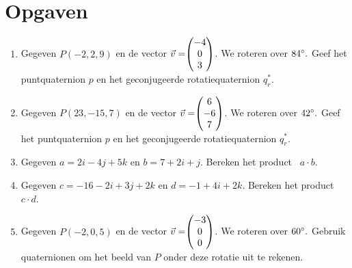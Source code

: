 
\newpage
\section{Opgaven}
\begin{enumerate}
	\item Gegeven $ P (-2, 2, 9) $ en de vector $\vec{v} = \vecdrie{-4}{0}{3} $. 
	We roteren over $ 84\degree. $ Geef het puntquaternion $p$ en het geconjugeerde rotatiequaternion  $  q_r^* $. \\
	\item Gegeven $ P (23, -15, 7) $ en de vector $\vec{v} = \vecdrie{6}{-6}{7} $. 
	We roteren over $ 42\degree. $ Geef het puntquaternion $p$ en het geconjugeerde rotatiequaternion  $  q_r^* $.\\
	
	\item Gegeven $ a = 2i-4j+5k$ en   $ b = 7+2i+j $. 
	Bereken het product \ $  a\cdot b $.\\
	\item Gegeven $ c = -16 -2i+3j+2k $ en   $ d = -1+4i+2k $. 
	Bereken het product \ $  c\cdot d $.\\
	
	\item Gegeven $ P (-2, 0, 5) $ en de vector $\vec{v} = \vecdrie{-3}{0}{0} $. 
	We roteren over $ 60\degree. $ Gebruik quaternionen om het beeld van $P$ onder deze rotatie uit te rekenen.\\
\end{enumerate}

